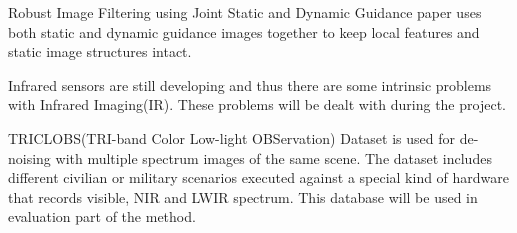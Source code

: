 \documentclass[10pt,twocolumn,letterpaper]{article}
\begin{document}
Robust Image Filtering using Joint Static and Dynamic Guidance\cite{ham2015} paper uses both static and dynamic guidance images together to keep local features and static image structures intact.

Infrared sensors are still developing and thus there are some intrinsic problems with Infrared Imaging(IR). These problems will be dealt with during the project.

TRICLOBS(TRI-band Color Low-light OBServation) Dataset\cite{triclobs} is used for de-noising with multiple spectrum images of the same scene. The dataset includes different civilian or military scenarios executed against a special kind of hardware that records visible, NIR and LWIR spectrum. This database will be used in evaluation part of the method\cite{ham2015}.

\end{document}
